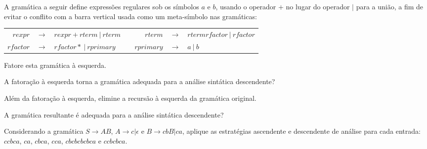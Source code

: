 \documentclass{compiladores}
\begin{document}
\begin{listanumerada}
\item
A gramática a seguir define expressões regulares sob os símbolos $a$ e
$b$, usando o operador $+$ no lugar do operador $|$ para a união, a
fim de evitar o conflito com a barra vertical usada como um
meta-símbolo nas gramáticas:
\begin{tabular}{rclcrcl}
$rexpr$ & $\rightarrow$ & $rexpr + rterm\ |\ rterm$ & \hfill & $rterm$ & $\rightarrow$ & $rterm rfactor\ |\ rfactor$ \\
$rfactor$ & $\rightarrow$ & $rfactor *\ |\ rprimary$ & \hfill & $rprimary$ & $\rightarrow$ & $a\ |\ b$
\end{tabular}
\begin{lista}
\item Fatore esta gramática à esquerda.
\item A fatoração à esquerda torna a gramática adequada para a análise sintática descendente?
\item Além da fatoração à esquerda, elimine a recursão à esquerda da gramática original.
\item A gramática resultante é adequada para a análise sintática descendente?
\end{lista}

\item Considerando a gramática $S \rightarrow AB$, $A \rightarrow
  c|{\epsilon}$ e $B \rightarrow cbB|ca$, aplique as estratégias
  ascendente e descendente de análise para cada entrada: $ccbca$,
  $ca$, $cbca$, $cca$, $cbcbcbcbca$ e $ccbcbca$.
\end{listanumerada}
\end{document}
